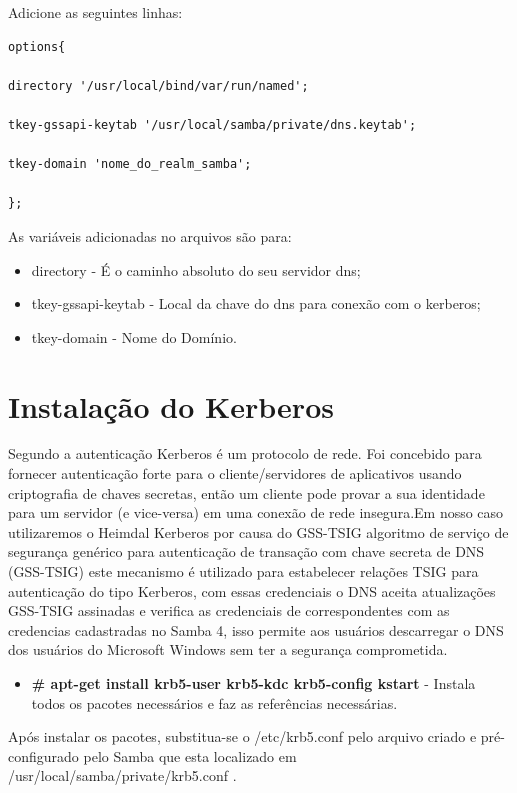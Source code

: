 Adicione as seguintes linhas:\\

\begin{lstlisting}
options{ 
	
directory '/usr/local/bind/var/run/named'; 

tkey-gssapi-keytab '/usr/local/samba/private/dns.keytab'; 

tkey-domain 'nome_do_realm_samba';
	
};
\end{lstlisting}

As variáveis adicionadas no arquivos são para:

\begin{itemize}
	\item{directory} -  É o caminho absoluto do seu servidor dns;
	\item{tkey-gssapi-keytab} - Local da chave do dns para conexão com o kerberos;
	\item{tkey-domain} - Nome do Domínio.
\end{itemize}

\section{Instalação do Kerberos}

Segundo  a autenticação Kerberos é um protocolo de rede. Foi concebido para fornecer autenticação forte para o cliente/servidores de aplicativos usando criptografia de chaves secretas, então um cliente pode provar a sua identidade para um servidor (e vice-versa) em uma conexão de rede insegura.Em nosso caso utilizaremos o Heimdal Kerberos por causa do GSS-TSIG algoritmo de serviço de segurança genérico para autenticação de transação com chave secreta de DNS (GSS-TSIG) este mecanismo é utilizado para estabelecer relações TSIG para autenticação do tipo Kerberos, com essas credenciais o DNS aceita atualizações GSS-TSIG assinadas e verifica as credenciais de correspondentes com as credencias cadastradas no Samba 4, isso permite aos usuários descarregar o DNS dos usuários do Microsoft Windows sem ter a segurança comprometida.

\begin{itemize}
	\item \textbf{\# apt-get install krb5-user krb5-kdc krb5-config kstart} - Instala todos os pacotes necessários e faz as referências necessárias.
\end{itemize}

Após instalar os pacotes, substitua-se o /etc/krb5.conf pelo arquivo criado e pré-configurado pelo Samba que esta localizado em /usr/local/samba/private/krb5.conf .


